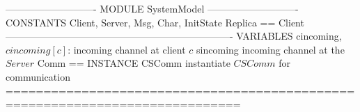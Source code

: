\documentclass{article}
\begin{document}
\begin{tla}
---------------------------- MODULE SystemModel ----------------------------
CONSTANTS Client, Server, Msg, Char, InitState
Replica == Client 
----------------------------------------------------------------------
VARIABLES cincoming,  \* $cincoming[c]$: incoming channel at client $c$ 
          sincoming   \* incoming channel at the $Server$
Comm == INSTANCE CSComm \* instantiate $CSComm$ for communication
=============================================================================
\end{tla}
\end{document}
